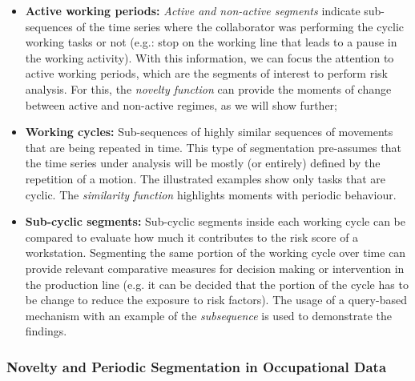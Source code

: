 \begin{itemize}
\label{items:occupational_detection}
    \item \textbf{Active working periods:} \textit{Active and non-active segments} indicate sub-sequences of the time series where the collaborator was performing the cyclic working tasks or not (e.g.: stop on the working line that leads to a pause in the working activity). With this information, we can focus the attention to active working periods, which are the segments of interest to perform risk analysis. For this, the \textit{novelty function} can provide the moments of change between active and non-active regimes, as we will show further;
    
    \item \textbf{Working cycles:} Sub-sequences of highly similar sequences of movements that are being repeated in time. This type of segmentation pre-assumes that the time series under analysis will be mostly (or entirely) defined by the repetition of a motion. The illustrated examples show only tasks that are cyclic. The \textit{similarity function} highlights moments with periodic behaviour.
    
    \item \textbf{Sub-cyclic segments:} Sub-cyclic segments inside each working cycle can be compared to evaluate how much it contributes to the risk score of a workstation. Segmenting the same portion of the working cycle over time can provide relevant comparative measures for decision making or intervention in the production line (e.g. it can be decided that the portion of the cycle has to be change to reduce the exposure to risk factors). The usage of a query-based mechanism with an example of the \textit{subsequence} is used to demonstrate the findings.
\end{itemize}


\subsubsection{Novelty and Periodic Segmentation in Occupational Data}

